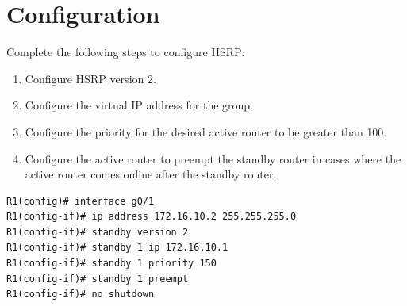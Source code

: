 \section{Configuration}
Complete the following steps to configure HSRP:
\begin{enumerate}
    \item Configure HSRP version 2.
    \item Configure the virtual IP address for the group.
    \item Configure the priority for the desired active router to be greater than 100.
    \item Configure the active router to preempt the standby router in cases where the active router comes online after the standby router.
    \end{enumerate}
\begin{verbatim}
R1(config)# interface g0/1
R1(config-if)# ip address 172.16.10.2 255.255.255.0
R1(config-if)# standby version 2
R1(config-if)# standby 1 ip 172.16.10.1
R1(config-if)# standby 1 priority 150
R1(config-if)# standby 1 preempt
R1(config-if)# no shutdown
\end{verbatim}
